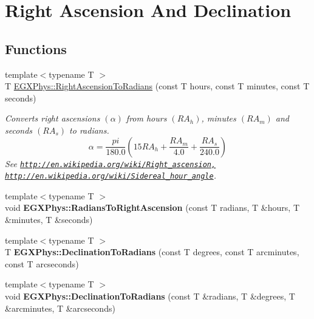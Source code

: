 \hypertarget{group___right_ascension_and_declination}{}\section{Right Ascension And Declination}
\label{group___right_ascension_and_declination}
\subsection*{Functions}
\begin{DoxyCompactItemize}
\item 
{\footnotesize template$<$typename T $>$ }\\T \mbox{\hyperlink{group___right_ascension_and_declination_ga25cb93de046663967af01d6687c423ae}{E\+G\+X\+Phys\+::\+Right\+Ascension\+To\+Radians}} (const T hours, const T minutes, const T seconds)
\begin{DoxyCompactList}\small\item\em Converts right ascensions $(\alpha)$ from hours $(RA_h)$, minutes $(RA_m)$ and seconds $(RA_s)$ to radians. \[\alpha=\frac{pi}{180.0}(15 RA_h + \frac{RA_m}{4.0} + \frac{RA_s}{240.0})\] See \href{http://en.wikipedia.org/wiki/Right_ascension,}{\tt http\+://en.\+wikipedia.\+org/wiki/\+Right\+\_\+ascension,} \href{http://en.wikipedia.org/wiki/Sidereal_hour_angle}{\tt http\+://en.\+wikipedia.\+org/wiki/\+Sidereal\+\_\+hour\+\_\+angle}. \end{DoxyCompactList}\item 
\mbox{\label{group___right_ascension_and_declination_ga1c7b757d2841b5ec067c87403e9b8867}} 
{\footnotesize template$<$typename T $>$ }\\void {\bfseries E\+G\+X\+Phys\+::\+Radians\+To\+Right\+Ascension} (const T radians, T \&hours, T \&minutes, T \&seconds)
\item 
\mbox{\label{group___right_ascension_and_declination_ga11a658bf9e00f4cb1682cda005ad39dc}} 
{\footnotesize template$<$typename T $>$ }\\T {\bfseries E\+G\+X\+Phys\+::\+Declination\+To\+Radians} (const T degrees, const T arcminutes, const T arcseconds)
\item 
\mbox{\label{group___right_ascension_and_declination_gad144150a085ddfeda10f1948f16b0a3e}} 
{\footnotesize template$<$typename T $>$ }\\void {\bfseries E\+G\+X\+Phys\+::\+Declination\+To\+Radians} (const T \&radians, T \&degrees, T \&arcminutes, T \&arcseconds)
\end{DoxyCompactItemize}



